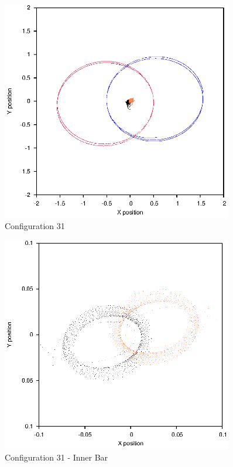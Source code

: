 \documentclass[a4paper,12pt]{article}
\begin{document}
\begin{figure}[H]
\centering
\includegraphics[width=0.9\textwidth]{./2017results/1-1-102-1/Orbit.eps}
\caption{Configuration 31}
\label{fig:config31}
\end{figure}
\begin{figure}[H]
\centering
\includegraphics[width=0.9\textwidth]{./2017results/1-1-102-1/Inner.eps}
\caption{Configuration 31 - Inner Bar}
\label{fig:config31i}
\end{figure}
\end{document}
